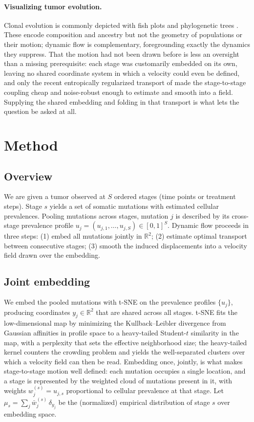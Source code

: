 \documentclass{article}
\begin{document}
\paragraph{Visualizing tumor evolution.} Clonal evolution is commonly depicted with
fish plots and phylogenetic trees \citep{Deshwar2015}. These encode composition and
ancestry but not the geometry of populations or their motion; dynamic flow is
complementary, foregrounding exactly the dynamics they suppress. That the motion had
not been drawn before is less an oversight than a missing prerequisite: each stage was
customarily embedded on its own, leaving no shared coordinate system in which a
velocity could even be defined, and only the recent entropically regularized transport
of \citet{Cuturi2013} made the stage-to-stage coupling cheap and noise-robust enough to
estimate and smooth into a field. Supplying the shared embedding and folding in that
transport is what lets the question be asked at all.

\section{Method}

\subsection{Overview}

We are given a tumor observed at $S$ ordered stages (time points or treatment steps).
Stage $s$ yields a set of somatic mutations with estimated cellular prevalences.
Pooling mutations across stages, mutation $j$ is described by its cross-stage
prevalence profile $u_j = (u_{j,1}, \dots, u_{j,S}) \in [0,1]^S$. Dynamic flow proceeds
in three steps: (1) embed all mutations jointly in $\mathbb{R}^2$; (2) estimate optimal
transport between consecutive stages; (3) smooth the induced displacements into a
velocity field drawn over the embedding.

\subsection{Joint embedding}

We embed the pooled mutations with t-SNE \citep{Maaten2008} on the prevalence profiles
$\{u_j\}$, producing coordinates $y_j \in \mathbb{R}^2$ that are shared across all
stages. t-SNE fits the low-dimensional map by minimizing the Kullback--Leibler
divergence from Gaussian affinities in profile space to a heavy-tailed Student-$t$
similarity in the map, with a perplexity that sets the effective neighborhood size;
the heavy-tailed kernel counters the crowding problem and yields the well-separated
clusters over which a velocity field can then be read. Embedding once, jointly, is what makes stage-to-stage motion well defined:
each mutation occupies a single location, and a stage is represented by the weighted
cloud of mutations present in it, with weights $w^{(s)}_j = u_{j,s}$ proportional to
cellular prevalence at that stage. Let $\mu_s = \sum_j \bar w^{(s)}_j \,\delta_{y_j}$ be
the (normalized) empirical distribution of stage $s$ over embedding space.
\end{document}
